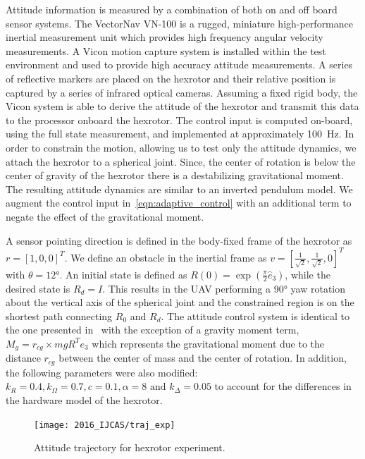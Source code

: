 Attitude information is measured by a combination of both on and off board sensor systems.
The VectorNav VN-100 is a rugged, miniature high-performance inertial measurement unit which provides high frequency angular velocity measurements.
A Vicon motion capture system is installed within the test environment and used to provide high accuracy attitude measurements. 
A series of reflective markers are placed on the hexrotor and their relative position is captured by a series of infrared optical cameras. 
Assuming a fixed rigid body, the Vicon system is able to derive the attitude of the hexrotor and transmit this data to the processor onboard the hexrotor.
The control input is computed on-board, using the full state measurement, and implemented at approximately \SI{100}{\hertz}.
In order to constrain the motion, allowing us to test only the attitude dynamics, we attach the hexrotor to a spherical joint.
Since, the center of rotation is below the center of gravity of the hexrotor there is a destabilizing gravitational moment.
The resulting attitude dynamics are similar to an inverted pendulum model.
We augment the control input in~\cref{eqn:adaptive_control} with an additional term to negate the effect of the gravitational moment.

A sensor pointing direction is defined in the body-fixed frame of the hexrotor as \( r = [1,0,0]^T \).
We define an obstacle in the inertial frame as \( v = [\frac{1}{\sqrt{2}}, \frac{1}{\sqrt{2}}, 0]^T \) with \( \theta = \ang{12} \).
An initial state is defined as \(R(0) = \exp( \frac{\pi}{2} \hat{e}_3) \), while the desired state is \(R_d =I \).
This results in the UAV performing a \ang{90} yaw rotation about the vertical axis of the spherical joint and the constrained region is on the shortest path connecting $R_0$ and $R_d$. 
The attitude control system is identical to the one presented in~ with the exception of a gravity moment term, \( M_g = r_{cg} \times m g R^T e_3\) which represents the gravitational moment due to the distance \( r_{cg} \) between the center of mass and the center of rotation. 
In addition, the following parameters were also modified: \(k_R = 0.4, k_\Omega = 0.7 ,c = 0.1 , \alpha = 8 \text{ and } k_\Delta = 0.05\) to account for the differences in the hardware model of the hexrotor.
\begin{figure}[t]
    \centering 
    \texttt{[image: 2016\_IJCAS/traj\_exp]}
    \caption{ Attitude trajectory for hexrotor experiment.\label{fig:traj_exp} }
    \label{fig:exp} 
\end{figure}

